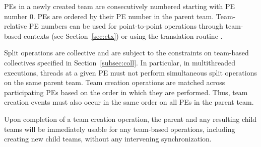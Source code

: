 \acp{PE} in a newly created team are consecutively numbered starting with
\ac{PE} number 0. \acp{PE} are ordered by their \ac{PE} number in
the parent team. Team-relative \ac{PE}
numbers can be used for point-to-point operations through team-based
contexts (see Section~\ref{sec:ctx}) or using the translation routine
.

Split operations are collective and are subject to the constraints on
team-based collectives specified in Section~\ref{subsec:coll}. In particular,
in multithreaded executions, threads at a given \ac{PE} must not perform
simultaneous split operations on the same parent team.
Team creation operations are matched across participating \acp{PE} based
on the order in which they are performed. Thus, team creation events must also
occur in the same order on all \acp{PE} in the parent team.

Upon completion of a team creation operation, the parent and any resulting child teams
will be immediately usable for any team-based operations, including creating new child
teams, without any intervening synchronization.
